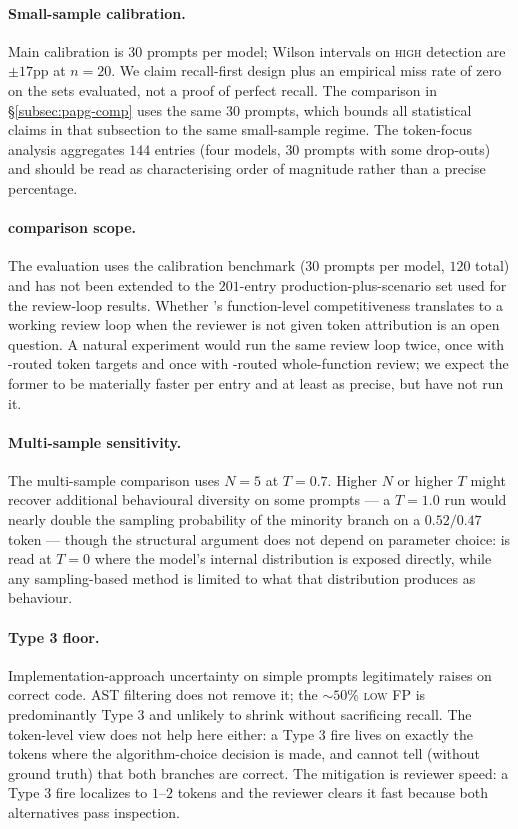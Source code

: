 \paragraph{Small-sample calibration.} Main calibration is $30$
prompts per model; Wilson intervals on \textsc{high} detection are
$\pm 17$pp at $n=20$. We claim recall-first design plus an empirical
miss rate of zero on the sets evaluated, not a proof of perfect
recall. The \papg comparison in \S\ref{subsec:papg-comp} uses the
same $30$ prompts, which bounds all statistical claims in that
subsection to the same small-sample regime. The token-focus
analysis aggregates $144$ entries (four models, $30$ prompts with
some drop-outs) and should be read as characterising order of
magnitude rather than a precise percentage.

\paragraph{\papg comparison scope.} The \papg evaluation uses the
calibration benchmark ($30$ prompts per model, $120$ total) and has
not been extended to the $201$-entry production-plus-scenario set
used for the review-loop results. Whether \papg's function-level
competitiveness translates to a working review loop when the
reviewer is not given token attribution is an open question. A
natural experiment would run the same review loop twice, once with
\eps-routed token targets and once with \papg-routed whole-function
review; we expect the former to be materially faster per entry and
at least as precise, but have not run it.

\paragraph{Multi-sample sensitivity.} The multi-sample comparison
uses $N=5$ at $T=0.7$. Higher $N$ or higher $T$ might recover
additional behavioural diversity on some prompts --- a $T=1.0$ run
would nearly double the sampling probability of the minority branch
on a $0.52/0.47$ token --- though the structural argument does not
depend on parameter choice: \eps is read at $T=0$ where the model's
internal distribution is exposed directly, while any sampling-based
method is limited to what that distribution produces as behaviour.

\paragraph{Type 3 floor.} Implementation-approach uncertainty on
simple prompts legitimately raises \eps on correct code. AST
filtering does not remove it; the $\sim 50\%$ \textsc{low} FP is
predominantly Type 3 and unlikely to shrink without sacrificing
recall. The token-level view does not help here either: a Type 3
fire lives on exactly the tokens where the algorithm-choice
decision is made, and \eps cannot tell (without ground truth) that
both branches are correct. The mitigation is reviewer speed: a
Type 3 fire localizes to $1$--$2$ tokens and the reviewer clears it
fast because both alternatives pass inspection.

